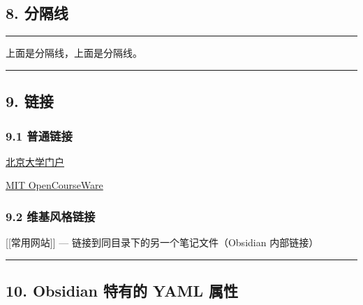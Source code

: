 \documentclass[]{article}
\begin{document}
\subsection{8. 分隔线}\label{ux5206ux9694ux7ebf}

\begin{center}\rule{0.5\linewidth}{0.5pt}\end{center}

上面是分隔线，上面是分隔线。

\begin{center}\rule{0.5\linewidth}{0.5pt}\end{center}

\subsection{9. 链接}\label{ux94feux63a5}

\subsubsection{9.1 普通链接}\label{ux666eux901aux94feux63a5}

\href{https://portal.pku.edu.cn/portal2017/}{北京大学门户}

\href{https://ocw.mit.edu/}{MIT OpenCourseWare}

\subsubsection{9.2
维基风格链接}\label{ux7ef4ux57faux98ceux683cux94feux63a5}

{[}{[}常用网站{]}{]} --- 链接到同目录下的另一个笔记文件（Obsidian
内部链接）

\begin{center}\rule{0.5\linewidth}{0.5pt}\end{center}

\subsection{10. Obsidian 特有的 YAML
属性}\label{obsidian-ux7279ux6709ux7684-yaml-ux5c5eux6027}

\begin{Shaded}
\begin{Highlighting}[]
\PreprocessorTok{{-}{-}{-}}
\KeywordTok{:}
\KeywordTok{:}
\AttributeTok{  }\KeywordTok{{-}}
\AttributeTok{  }\KeywordTok{{-}}
\KeywordTok{:}
\KeywordTok{:}
\KeywordTok{:}
\AttributeTok{  }\KeywordTok{{-}}
\PreprocessorTok{{-}{-}{-}}

\end{Highlighting}
\end{Shaded}
\end{document}
